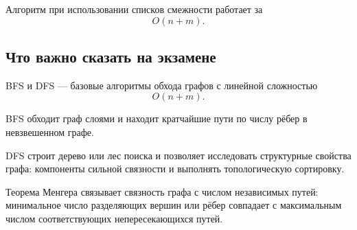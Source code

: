 Алгоритм при использовании списков смежности работает за
\[
O(n+m).
\]

\subsection{Что важно сказать на экзамене}

BFS и DFS --- базовые алгоритмы обхода графов с линейной сложностью
\[
O(n+m).
\]

BFS обходит граф слоями и находит кратчайшие пути по числу рёбер в невзвешенном графе.

DFS строит дерево или лес поиска и позволяет исследовать структурные свойства графа: компоненты сильной связности и выполнять топологическую сортировку.

Теорема Менгера связывает связность графа с числом независимых путей:
минимальное число разделяющих вершин или рёбер совпадает с максимальным
числом соответствующих непересекающихся путей.

\newpage